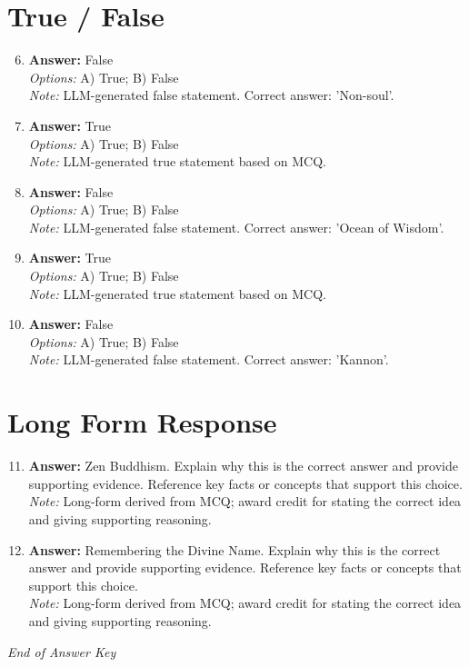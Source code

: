 \documentclass[12pt]{article}
\begin{document}
\section*{True / False}
\begin{enumerate}[label=\arabic*.]
\setcounter{enumi}{5}
\item \textbf{Answer:} False
\\ \textit{Options:} A) True; B) False
\\ \textit{Note:} LLM-generated false statement. Correct answer: 'Non-soul'.
\item \textbf{Answer:} True
\\ \textit{Options:} A) True; B) False
\\ \textit{Note:} LLM-generated true statement based on MCQ.
\item \textbf{Answer:} False
\\ \textit{Options:} A) True; B) False
\\ \textit{Note:} LLM-generated false statement. Correct answer: 'Ocean of Wisdom'.
\item \textbf{Answer:} True
\\ \textit{Options:} A) True; B) False
\\ \textit{Note:} LLM-generated true statement based on MCQ.
\item \textbf{Answer:} False
\\ \textit{Options:} A) True; B) False
\\ \textit{Note:} LLM-generated false statement. Correct answer: 'Kannon'.
\end{enumerate}

\section*{Long Form Response}
\begin{enumerate}[label=\arabic*.]
\setcounter{enumi}{10}
\item \textbf{Answer:} Zen Buddhism. Explain why this is the correct answer and provide supporting evidence. Reference key facts or concepts that support this choice.
\\ \textit{Note:} Long-form derived from MCQ; award credit for stating the correct idea and giving supporting reasoning.
\item \textbf{Answer:} Remembering the Divine Name. Explain why this is the correct answer and provide supporting evidence. Reference key facts or concepts that support this choice.
\\ \textit{Note:} Long-form derived from MCQ; award credit for stating the correct idea and giving supporting reasoning.
\end{enumerate}

\vfill
\noindent\textit{End of Answer Key}
\end{document}
